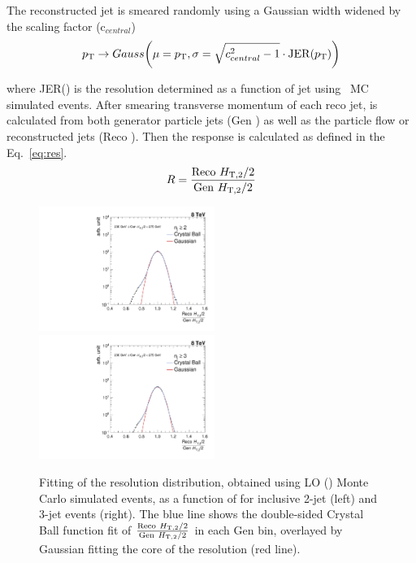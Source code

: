 The reconstructed jet \pt is smeared randomly using a Gaussian width widened by the scaling factor (c$_{central}$) 
\begin{equation}
p_{\mathrm{T}} \rightarrow Gauss\bigg(\mu = p_{\mathrm{T}}, \sigma = \sqrt{c^2_{central} - 1} \cdot {\rm JER}(p_{\mathrm{T}})\bigg)
\end{equation}

where JER(\pt) is the resolution determined as a function of jet \pt using \MGP~MC simulated events. After smearing transverse momentum of each reco jet, \httwo is calculated from both generator particle jets (Gen \httwons) as well as the particle flow or reconstructed jets (Reco \httwons). Then the response is calculated as defined in the Eq.~\ref{eq:res}. 
\begin{equation}
\label{eq:res}
  R = \frac{{\rm Reco}~\httwo}{{\rm Gen}~\httwo}
\end{equation}

\begin{figure}[ht]
  \begin{center}
   \hspace*{-5mm}\includegraphics[width=0.51\textwidth]{Plots_HT_2_150/Fit_Res_2_final_crystal_genbin_250-275_crystal_nomet.pdf}%
    ~~\includegraphics[width=0.51\textwidth]{Plots_HT_2_150/Fit_Res_3_final_crystal_genbin_250-275_crystal_nomet.pdf}
    \caption{Fitting of the resolution distribution, obtained using LO \MadGraphFn\plusn \PYTHIAS (\MGP) Monte Carlo simulated events, as a function of \httwo for inclusive 2-jet (left) and 3-jet events (right). The blue line shows the double-sided Crystal Ball function fit of $\frac{{\rm Reco}~\httwo}{{\rm Gen}~\httwo}$ in each Gen \httwo bin, overlayed by Gaussian fitting the core of the resolution (red line).}
    \label{fig:fit_gauss}
  \end{center}
\end{figure}

